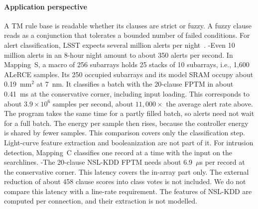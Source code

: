 \paragraph{Application perspective}
A TM rule base is readable whether its clauses are strict or fuzzy.
A fuzzy clause reads as a conjunction that tolerates a bounded number of failed conditions.
For alert classification, LSST expects several million alerts per night~\cite{ivezic2019lsst}. \hyp{Even 10 million alerts in an 8-hour night amount to about 350 alerts per second.
In Mapping~S, a macro of 256 subarrays holds 25 stacks of 10 subarrays, i.e., 1,600 ALeRCE samples. Its 250 occupied subarrays and its model SRAM occupy about 0.19~mm$^2$ at 7~nm. It classifies a batch with the 20-clause FPTM in about 0.41~ms at the conservative corner, including input loading. This corresponds to about $3.9\times10^6$ samples per second, about $11{,}000\times$ the average alert rate above.
The program takes the same time for a partly filled batch, so alerts need not wait for a full batch. The energy per sample then rises, because the controller energy is shared by fewer samples.}
This comparison covers only the classification step. Light-curve feature extraction and booleanization are not part of it.
For intrusion detection, Mapping~C classifies one record at a time with the input on the searchlines. \hyp{The 20-clause NSL-KDD FPTM needs about 6.9~$\mu$s per record at the conservative corner.} This latency covers the in-array part only. The external reduction of about 458 clause scores into class votes is not included. We do not compare this latency with a line-rate requirement. The features of NSL-KDD are computed per connection, and their extraction is not modelled.


